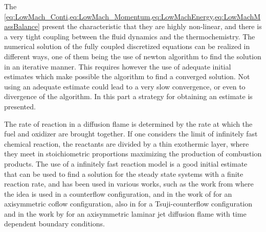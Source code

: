 The \cref{eq:LowMach_Conti,eq:LowMach_Momentum,eq:LowMachEnergy,eq:LowMachMassBalance} present the characteristic that they are highly non-linear, and there is a very tight coupling between the fluid dynamics and the thermochemistry. The numerical solution of the fully coupled discretized equations can be realized in different ways, one of them being the use of newton algorithm to find the solution in an iterative manner. This requires however the use of adequate initial estimates which make possible the algorithm to find a converged solution. Not using an adequate estimate could lead to a very slow convergence, or even to divergence of the algorithm. In this part a strategy for obtaining an estimate is presented.

The rate of reaction in a diffusion flame is determined by the rate at which the fuel and oxidizer are brought together. If one considers the limit of infinitely fast chemical reaction, the reactants are divided by a thin exothermic layer, where they meet in stoichiometric proportions maximizing the production of combustion products. The use of a infinitely fast reaction model is a good initial estimate that can be used to find a solution for the steady state systems with a finite reaction rate, and has been used in various works, such as the work from \textcite{keyesFlameSheetStarting1987} where the idea is used in a counterflow configuration, and in the work of \textcite{smookeNumericalSolutionTwoDimensional1986} for an axisymmetric coflow configuration, 
also in \textcite{smookeNumericalModelingAxisymmetric1992} for a Tsuji-counterflow configuration and in the work by  \textcite{dobbinsFullyImplicitCompact2010} for an axisymmetric laminar jet diffusion flame with time dependent boundary conditions.

